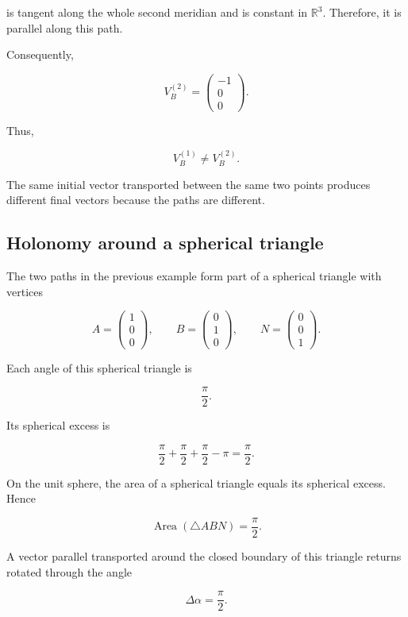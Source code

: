\documentclass[12pt,a4paper]{article}
\theoremstyle{notespace}
\begin{document}
is tangent along the whole second meridian and is constant in
\(\mathbb{R}^3\). Therefore, it is parallel along this path.

Consequently,

\[
\boxed{
	V_B^{(2)}
	=
	\begin{pmatrix}
		-1\\
		0\\
		0
	\end{pmatrix}.
}
\]

Thus,

\[
\boxed{
	V_B^{(1)}
	\neq
	V_B^{(2)}.
}
\]

The same initial vector transported between the same two points produces
different final vectors because the paths are different.

\subsection{Holonomy around a spherical triangle}

The two paths in the previous example form part of a spherical triangle
with vertices

\[
A=
\begin{pmatrix}
	1\\
	0\\
	0
\end{pmatrix},
\qquad
B=
\begin{pmatrix}
	0\\
	1\\
	0
\end{pmatrix},
\qquad
N=
\begin{pmatrix}
	0\\
	0\\
	1
\end{pmatrix}.
\]

Each angle of this spherical triangle is

\[
\frac{\pi}{2}.
\]

Its spherical excess is

\[
\frac{\pi}{2}
+
\frac{\pi}{2}
+
\frac{\pi}{2}
-
\pi
=
\frac{\pi}{2}.
\]

On the unit sphere, the area of a spherical triangle equals its
spherical excess. Hence

\[
\operatorname{Area}(\triangle ABN)
=
\frac{\pi}{2}.
\]

A vector parallel transported around the closed boundary of this
triangle returns rotated through the angle

\[
\boxed{
	\Delta\alpha=\frac{\pi}{2}.
}
\]
\end{document}
